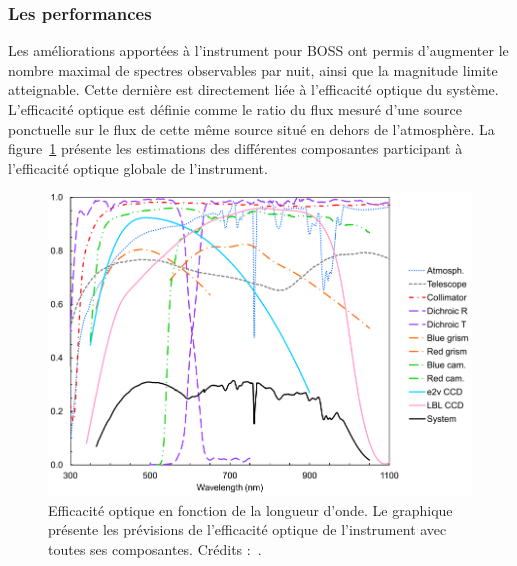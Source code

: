 \documentclass[11pt, twoside, a4paper, openright]{report}
\begin{document}
\subsubsection{Les performances}
Les améliorations apportées à l'instrument pour BOSS ont permis d'augmenter le nombre maximal de spectres observables par nuit, ainsi que la magnitude limite atteignable. Cette dernière est directement liée à l'efficacité optique du système. L'efficacité optique est définie comme le ratio du flux mesuré d'une source ponctuelle sur le flux de cette même source situé en dehors de l'atmosphère. La figure~\ref{fig:SpectroThroughput} présente les estimations des différentes composantes participant à l'efficacité optique globale de l'instrument. %
\begin{figure}
  \centering
  \includegraphics[scale=0.35]{../img/eBOSS/SpectroThroughput}
  \caption{Efficacité optique en fonction de la longueur d'onde. Le graphique présente les prévisions de l'efficacité optique de l'instrument avec toutes ses composantes. Crédits :~\cite{Smee2012}.}
  \label{fig:SpectroThroughput}
\end{figure}
\end{document}
